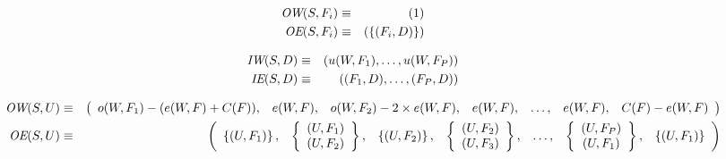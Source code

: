 \begin{eqnarray*} 
\mbox{\it OW}(S,F_i) & \equiv & (1) \\
\mbox{\it OE}(S,F_i) & \equiv & (\{(F_i, D)\}) 
\end{eqnarray*} 

\begin{eqnarray*} 
\mbox{\it IW}(S,D) & \equiv & (u(W,F_1),\ldots,u(W, F_P)) \\
\mbox{\it IE}(S,D) & \equiv & ((F_1, D),\dots,(F_P, D)) 
\end{eqnarray*}

\begin{figure*}[t]
\begin{eqnarray*} 
\mbox{\it OW}(S,U) & \equiv & \left( \begin{array}{ccccccc} 
o(W,F_1) - (e(W,F) + C(F)), & e(W,F), & o(W,F_2) - 2 \times e(W,F), &
e(W,F), & \ldots, & e(W,F), & C(F) - e(W,F) \end{array} \right) \\
\mbox{\it OE}(S,U) & \equiv  & 
\left( 
\begin{array}{ccccccc} 
	\left\{ (U,F_1) \right\}, & 
	\left\{	
		\begin{array}{c} (U,F_1) \\ (U,F_2) 
		\end{array} 
	\right\}, &
	\left\{ (U,F_2) \right\}, & 
	\left\{	
		\begin{array}{c} (U,F_2) \\ (U,F_3) 
		\end{array} 
	\right\}, &
	\ldots, & 	
	\left\{	
		\begin{array}{c} (U,F_P) \\ (U,F_1) 
		\end{array} 
	\right\}, &
	\left\{ (U,F_1) \right\} 
\end{array} \right)
\end{eqnarray*} 
\end{figure*}
